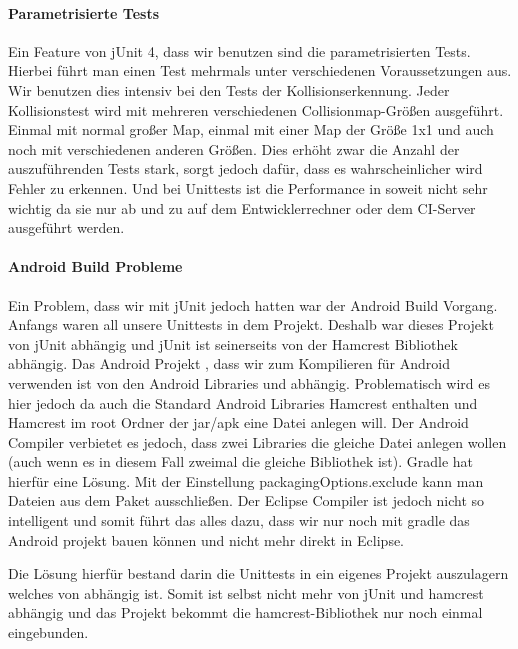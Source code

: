 \paragraph{Parametrisierte Tests}

Ein Feature von jUnit 4, dass wir benutzen sind die parametrisierten Tests\cite{JUPT}. 
Hierbei führt man einen Test mehrmals unter verschiedenen Voraussetzungen aus. 
Wir benutzen dies intensiv bei den Tests der Kollisionserkennung. 
Jeder Kollisionstest wird mit mehreren verschiedenen Collisionmap-Größen ausgeführt. 
Einmal mit normal großer Map, einmal mit einer Map der Größe 1x1 und auch noch mit verschiedenen anderen Größen. 
Dies erhöht zwar die Anzahl der auszuführenden Tests stark, sorgt jedoch dafür, dass es wahrscheinlicher wird Fehler zu erkennen. 
Und bei Unittests ist die Performance in soweit nicht sehr wichtig da sie nur ab und zu auf dem Entwicklerrechner oder dem CI-Server ausgeführt werden.

\paragraph{Android Build Probleme}

Ein Problem, dass wir mit jUnit jedoch hatten war der Android Build Vorgang. 
Anfangs waren all unsere Unittests in dem  Projekt. Deshalb war dieses Projekt von jUnit abhängig und jUnit ist seinerseits von der Hamcrest Bibliothek abhängig\cite{HCRST}. 
Das Android Projekt , dass wir zum Kompilieren für Android verwenden ist von den Android Libraries und  abhängig.
Problematisch wird es hier jedoch da auch die Standard Android Libraries Hamcrest enthalten und Hamcrest im root Ordner der jar/apk eine Datei  anlegen will. Der Android Compiler verbietet es jedoch, dass zwei Libraries die gleiche Datei anlegen wollen (auch wenn es in diesem Fall zweimal die gleiche Bibliothek ist).
Gradle hat hierfür eine Lösung. Mit der Einstellung packagingOptions.exclude kann man Dateien aus dem Paket ausschließen. Der Eclipse Compiler ist jedoch nicht so intelligent und somit führt das alles dazu, dass wir nur noch mit gradle das Android projekt bauen können und nicht mehr direkt in Eclipse.

Die Lösung hierfür bestand darin die Unittests in ein eigenes Projekt  auszulagern welches von  abhängig ist. Somit ist  selbst nicht mehr von jUnit und hamcrest abhängig und das Projekt  bekommt die hamcrest-Bibliothek nur noch einmal eingebunden.